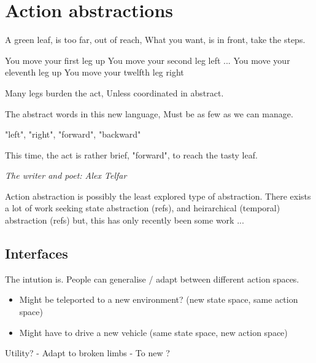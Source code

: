 \newpage
\section{Action abstractions}


\epigraph{
A green leaf, is too far, out of reach,
What you want, is in front, take the steps.

You move your first leg up You move your second leg left ... You move your eleventh leg up You move your twelfth leg right

Many legs burden the act,
Unless coordinated in abstract.

The abstract words in this new language,
Must be as few as we can manage.

"left", "right", "forward", "backward"

This time, the act is rather brief,
"forward", to reach the tasty leaf.
}{\textit{The writer and poet: Alex Telfar}}


Action abstraction is possibly the least explored type of abstraction.
There exists a lot of work seeking state abstraction (refs), and heirarchical (temporal) abstraction (refs)
but, this has only recently been some work ...

\subsection{Interfaces}

The intution is.
People can generalise / adapt between different action spaces.

\begin{itemize}
\tightlist
\item
  Might be teleported to a new environment? (new state space, same
  action space)
\item
  Might have to drive a new vehicle (same state space, new action space)
\end{itemize}


Utility?
- Adapt to broken limbs
- To new ?






